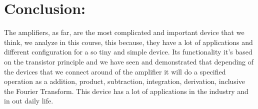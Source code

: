 \section{Conclusion:}

The amplifiers, as far, are the most complicated and important device that we think, we analyze in this course, this because, they have a lot of applications and different configuration for a so tiny and simple device. Its functionality it's based on the transistor principle and we have seen and demonstrated that depending of the devices that we connect around of the amplifier it will do a specified operation as a addition, product, subtraction, integration, derivation, inclusive the Fourier Transform. This device has a lot of applications in the industry and in out daily life.

\pagebreak